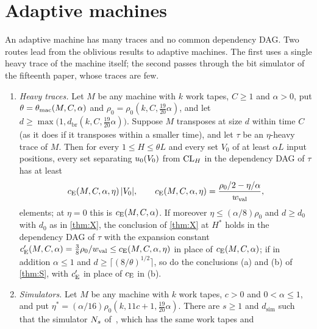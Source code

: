 \section{Adaptive machines}\label{sec:adaptive}

An adaptive machine has many traces and no common dependency DAG. Two routes lead from the oblivious results to adaptive machines.
The first uses a single heavy trace of the machine itself; the second passes through the bit simulator of the fifteenth paper, whose
traces are few.

\begin{theorem}\label{thm:E}
\begin{enumerate}[label=(\alph*)]
\item \emph{Heavy traces.} Let $M$ be any machine with $k$ work tapes, $C\ge1$ and $\alpha>0$, put $\theta=\theta_{\mathrm{mac}}(M,C,\alpha)$ and
$\rho_0=\rho_0(k,C,\tfrac{19}{20}\alpha)$, and let $d\ge\max\bigl(1,d_{\mathrm{br}}(k,C,\tfrac{19}{20}\alpha)\bigr)$. Suppose $M$ transposes at size
$d$ within time $C$ (as it does if it transposes within a smaller time), and let $\tau$ be an $\eta$-heavy trace of $M$. Then for every
$1\le H\le\theta L$ and every set $V_0$ of at least $\alpha L$ input positions, every set separating $u_0(V_0)$ from $\mathrm{CL}_H$ in the
dependency DAG of $\tau$ has at least
\[
  c_{\mathrm{E}}(M,C,\alpha,\eta)\,\lvert V_0 \rvert,\qquad c_{\mathrm{E}}(M,C,\alpha,\eta)=\frac{\rho_0/2-\eta/\alpha}{w_{\mathrm{val}}},
\]
elements; at $\eta=0$ this is $c_{\mathrm{E}}(M,C,\alpha)$. If moreover $\eta\le(\alpha/8)\rho_0$ and $d\ge d_0$ with $d_0$ as in \cref{thm:X}, the
conclusion of \cref{thm:X} at $H^*$ holds in the dependency DAG of $\tau$ with the expansion constant
$c_{\mathrm{E}}'(M,C,\alpha)=\frac38\rho_0/w_{\mathrm{val}}\le c_{\mathrm{E}}(M,C,\alpha,\eta)$ in place of $c_{\mathrm{E}}(M,C,\alpha)$; if in addition $\alpha\le1$ and
$d\ge\lceil(8/\theta)^{1/2}\rceil$, so do the conclusions (a) and (b) of \cref{thm:S}, with $c_{\mathrm{E}}'$ in place of $c_{\mathrm{E}}$ in (b).
\item \emph{Simulators.} Let $M$ be any machine with $k$ work tapes, $c>0$ and $0<\alpha\le1$, and put $\eta^*=(\alpha/16)\rho_0(k,11c+1,\tfrac{19}{20}\alpha)$.
There are $s\ge1$ and $d_{\mathrm{sim}}$ such that the simulator $N_s$ of~\cite[Theorem~S]{HighRate2026}, which has the same work tapes and

\end{enumerate}
\end{theorem}
